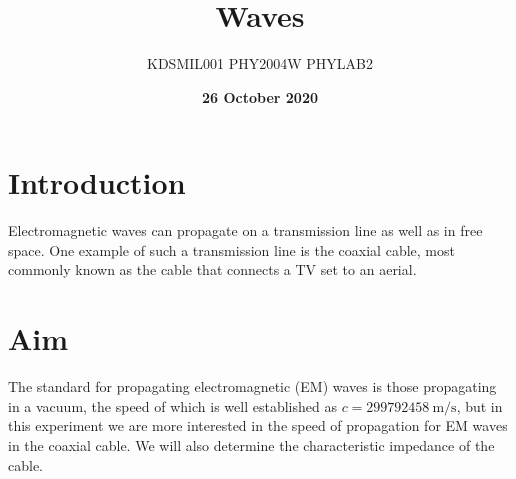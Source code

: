\documentclass[12pt]{article}
\title{Waves}
\author{KDSMIL001 \; PHY2004W PHYLAB2}
\date{\textbf{26 October 2020}}
\numberwithin{equation}{section}
\numberwithin{figure}{section}
\begin{document}
    \begin{titlepage}
        \maketitle
        \center
        \tableofcontents
    \end{titlepage}
    
    \section{Introduction}\label{sec:Introduction}
    Electromagnetic waves can propagate on a transmission line as well as in free space. One 
    example of such a transmission line is the coaxial cable, most commonly known as the cable 
    that connects a TV set to an aerial. 

    \section{Aim}\label{sec:Aim}
    The standard for propagating electromagnetic (EM) waves is those propagating in a vacuum, 
    the speed of which is well established as $c=\SI{299792458}{\metre/\second}$, but in this 
    experiment we are more interested in the speed of propagation for EM waves in the coaxial 
    cable. We will also determine the characteristic impedance of the cable. 
\end{document}
